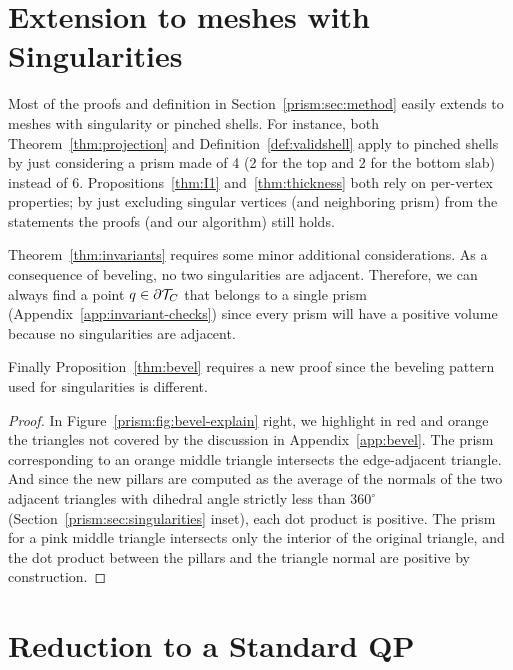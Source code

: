 \section{Extension to meshes with Singularities}\label{app:singularity}
Most of the proofs and definition in Section~\ref{prism:sec:method} easily extends to meshes with singularity or pinched shells. For instance,
{both} Theorem~\ref{thm:projection} and Definition~\ref{def:validshell} apply to pinched shells by just considering a prism made of 4 (2 for the top and 2 for the bottom slab) instead of 6. Propositions~\ref{thm:I1} and~\ref{thm:thickness} both rely on per-vertex properties; by just excluding singular vertices (and neighboring prism) from the statements the proofs (and our algorithm) still holds.


Theorem~\ref{thm:invariants} requires some minor additional considerations. As a consequence of beveling, no two singularities are adjacent. Therefore, we can always find a point $q \in \partial \mathcal{T}_C$ that belongs to a single prism (Appendix~\ref{app:invariant-checks}) since every prism will have a positive volume
because no singularities are adjacent.


Finally Proposition~\ref{thm:bevel} requires a new proof since the beveling pattern used for singularities is different.
\begin{proof}
In  Figure~\ref{prism:fig:bevel-explain} right, we highlight in red and orange the triangles not covered by the discussion in Appendix~\ref{app:bevel}. 
The prism corresponding to an orange middle triangle intersects the edge-adjacent triangle. And since the new pillars are computed as the average of the normals of the two adjacent triangles with dihedral angle strictly less than $360^\circ$ 
 (Section~\ref{prism:sec:singularities} inset), each dot product is positive. 
The prism {for} a pink middle triangle intersects only the interior of the original triangle, and the dot product between the pillars and the triangle normal are positive by construction. 
\end{proof}



\section{Reduction to a Standard QP}
\label{app:qp}

